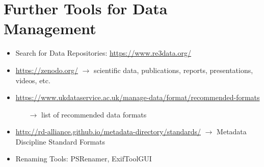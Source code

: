 \section{Further Tools for Data Management}

\begin{itemize}
  \item Search for Data Repositories: \url{https://www.re3data.org/}
  \item \url{https://zenodo.org/}  $\rightarrow$ scientific data, publications,
        reports, presentations, videos, etc.
  \item \url{https://www.ukdataservice.ac.uk/manage-data/format/recommended-formats}
        \begin{itemize}
          \item[$\rightarrow$] list of recommended data formats
        \end{itemize}
  \item \url{http://rd-alliance.github.io/metadata-directory/standards/}
        $\rightarrow$ Metadata Discipline Standard Formats
  \item Renaming Tools: PSRenamer, ExifToolGUI
\end{itemize}

